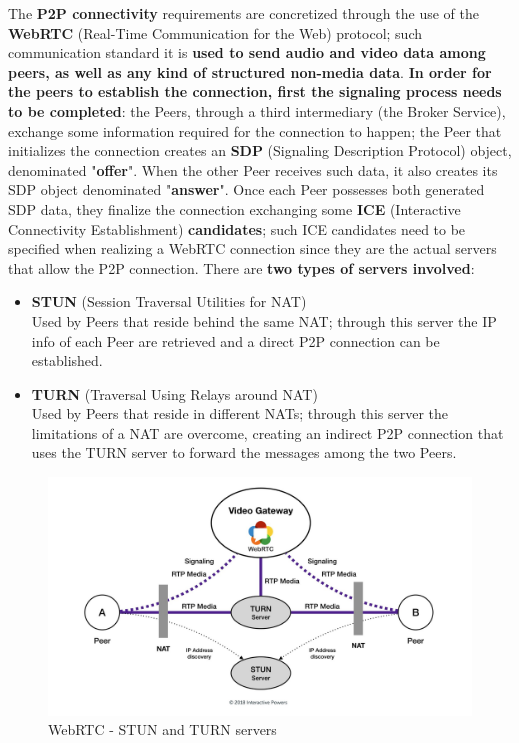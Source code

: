 The \textbf{P2P connectivity} requirements are concretized through the use of the \textbf{WebRTC} (Real-Time Communication for the Web) protocol; such communication standard it is \textbf{used to send audio and video data among peers, as well as any kind of structured non-media data}. \textbf{In order for the peers to establish the connection, first the signaling process needs to be completed}: the Peers, through a third intermediary (the Broker Service), exchange some information required for the connection to happen; the Peer that initializes the connection creates an \textbf{SDP} (Signaling Description Protocol) object, denominated "\textbf{offer}". When the other Peer receives such data, it also creates its SDP object denominated "\textbf{answer}". Once each Peer possesses both generated SDP data, they finalize the connection exchanging some \textbf{ICE} (Interactive Connectivity Establishment) \textbf{candidates}; such ICE candidates need to be specified when realizing a WebRTC connection since they are the actual servers that allow the P2P connection. There are \textbf{two types of servers involved}:
\begin{itemize}
    \item \textbf{STUN} (Session Traversal Utilities for NAT)\\
    Used by Peers that reside behind the same NAT; through this server the IP info of each Peer are retrieved and a direct P2P connection can be established.
    \item \textbf{TURN} (Traversal Using Relays around NAT)\\
    Used by Peers that reside in different NATs; through this server the limitations of a NAT are overcome, creating an indirect P2P connection that uses the TURN server to forward the messages among the two Peers.
\end{itemize}

\begin{figure}[!ht]
    \centering
    \includegraphics[scale=0.15]{document/chapters/chapter_6/images/webrtc.jpeg}
    \caption{WebRTC - STUN and TURN servers \cite{stun_and_turn_servers}}
    \label{fig:webrtc}
\end{figure}

